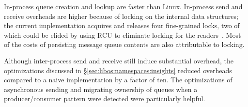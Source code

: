 In-process queue creation and lookup are faster than Linux.
In-process send and receive overheads are higher
because of locking on the internal data structures; the current implementation acquires and releases four
fine-grained locks, two of which could be elided by using RCU to eliminate locking for the readers~\cite{mckenney04rcu}.
Most of the costs of persisting message queue contents are also attributable to locking.

Although inter-process send and receive still induce substantial overhead, the optimizations
discussed in \S\ref{sec:libos:namespaces:insights} reduced overheads compared to a naive implementation
by a factor of ten.  The optimizations of asynchronous sending and migrating ownership of queues
when a producer/consumer pattern were detected were particularly helpful.



